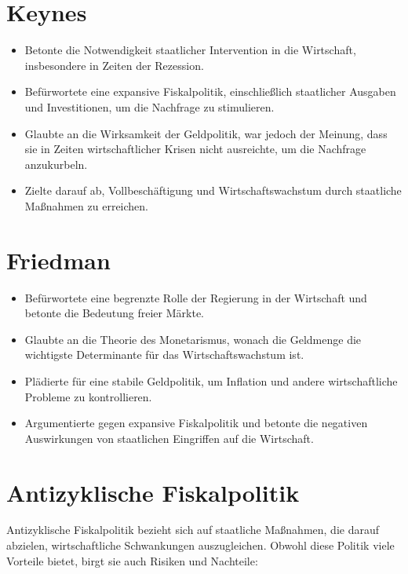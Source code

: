 \documentclass[12pt,a4paper]{report}
\begin{document}
	\section{Keynes}
	\begin{itemize}
	    \item Betonte die Notwendigkeit staatlicher Intervention in die Wirtschaft, insbesondere in Zeiten der Rezession.
	    \item Befürwortete eine expansive Fiskalpolitik, einschließlich staatlicher Ausgaben und Investitionen, um die Nachfrage zu stimulieren.
	    \item Glaubte an die Wirksamkeit der Geldpolitik, war jedoch der Meinung, dass sie in Zeiten wirtschaftlicher Krisen nicht ausreichte, um die Nachfrage anzukurbeln.
   	 \item Zielte darauf ab, Vollbeschäftigung und Wirtschaftswachstum durch staatliche Maßnahmen zu erreichen.
	\end{itemize}

	\section{Friedman}
	\begin{itemize}
	    \item Befürwortete eine begrenzte Rolle der Regierung in der Wirtschaft und betonte die Bedeutung freier Märkte.
	    \item Glaubte an die Theorie des Monetarismus, wonach die Geldmenge die wichtigste Determinante für das Wirtschaftswachstum ist.
	    \item Plädierte für eine stabile Geldpolitik, um Inflation und andere wirtschaftliche Probleme zu kontrollieren.
	    \item Argumentierte gegen expansive Fiskalpolitik und betonte die negativen Auswirkungen von staatlichen Eingriffen auf die Wirtschaft.
	\end{itemize}
	
	
	\section{Antizyklische Fiskalpolitik}
Antizyklische Fiskalpolitik bezieht sich auf staatliche Maßnahmen, die darauf abzielen, wirtschaftliche Schwankungen auszugleichen. Obwohl diese Politik viele Vorteile bietet, birgt sie auch Risiken und Nachteile:
\end{document}

